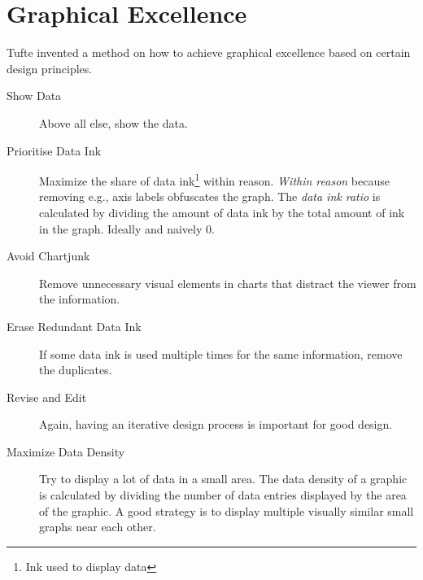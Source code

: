 \section{Graphical Excellence}
Tufte invented a method on how to achieve graphical excellence based on certain design principles.
\begin{description}
    \item[Show Data] Above all else, show the data.

    \item[Prioritise Data Ink] Maximize the share of data ink\footnote{Ink used to display data} within reason.
        \emph{Within reason} because removing e.g., axis labels obfuscates the graph.
        The \emph{data ink ratio} is calculated by dividing the amount of data ink by the total amount of ink in the graph.
        Ideally and naively 0.

    \item[Avoid Chartjunk] Remove unnecessary visual elements in charts that distract the viewer from the information.

    \item[Erase Redundant Data Ink] If some data ink is used multiple times for the same information, remove the duplicates.

    \item[Revise and Edit] Again, having an iterative design process is important for good design.

    \item[Maximize Data Density] Try to display a lot of data in a small area.
        The data density of a graphic is calculated by dividing the number of data entries displayed by the area of the graphic.
        A good strategy is to display multiple visually similar small graphs near each other.
\end{description}
